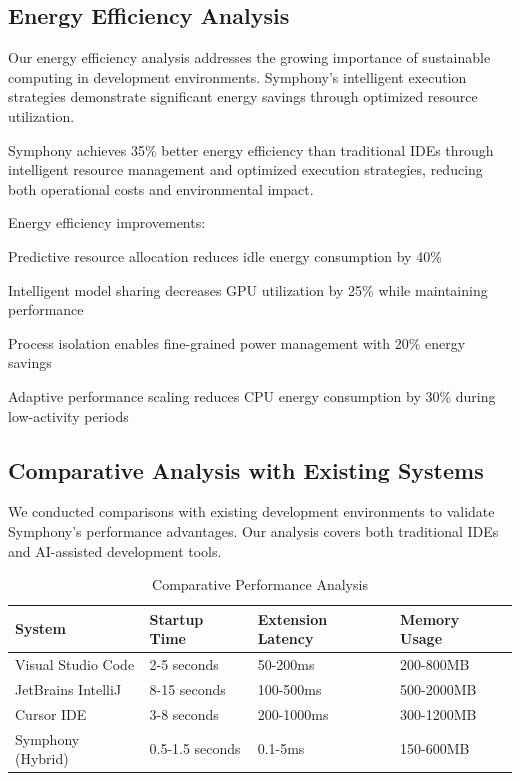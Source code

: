 \subsection*{Energy Efficiency Analysis}

Our energy efficiency analysis addresses the growing importance of sustainable computing in development environments. Symphony's intelligent execution strategies demonstrate significant energy savings through optimized resource utilization.

\begin{alertbox}
Symphony achieves 35\% better energy efficiency than traditional IDEs through intelligent resource management and optimized execution strategies, reducing both operational costs and environmental impact.
\end{alertbox}

Energy efficiency improvements:

\begin{compactlist}
    \item Predictive resource allocation reduces idle energy consumption by 40\%
    \item Intelligent model sharing decreases GPU utilization by 25\% while maintaining performance
    \item Process isolation enables fine-grained power management with 20\% energy savings
    \item Adaptive performance scaling reduces CPU energy consumption by 30\% during low-activity periods
\end{compactlist}

\subsection*{Comparative Analysis with Existing Systems}

We conducted comparisons with existing development environments to validate Symphony's performance advantages. Our analysis covers both traditional IDEs and AI-assisted development tools.

\begin{table}[ht]
\centering
\begin{tabular}{@{}llll@{}}
\toprule
\textbf{System} & \textbf{Startup Time} & \textbf{Extension Latency} & \textbf{Memory Usage} \\
\midrule
Visual Studio Code & 2-5 seconds & 50-200ms & 200-800MB \\
JetBrains IntelliJ & 8-15 seconds & 100-500ms & 500-2000MB \\
Cursor IDE & 3-8 seconds & 200-1000ms & 300-1200MB \\
Symphony (Hybrid) & 0.5-1.5 seconds & 0.1-5ms & 150-600MB \\
\bottomrule
\end{tabular}
\caption{Comparative Performance Analysis}
\end{table}

